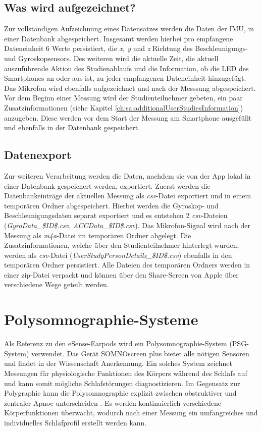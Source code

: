 \subsection{Was wird aufgezeichnet?}
\label{ch:sa:ep:what_to_record}
Zur vollständigen Aufzeichnung eines Datensatzes werden die Daten der IMU, in einer Datenbank abgespeichert.
Insgesamt werden hierbei pro empfangene Dateneinheit 6 Werte persistiert, die \textit{x, y} und \textit{z} Richtung des Beschleunigungs- und Gyroskopsensors. 
Des weiteren wird die aktuelle Zeit, die aktuell auszuführende Aktion des Studienablaufs und die Information, ob die LED des Smartphones an oder aus ist, zu jeder empfangenen Dateneinheit hinzugefügt.
Das Mikrofon wird ebenfalls aufgezeichnet und nach der Messsung abgespeichert.
Vor dem Beginn einer Messung wird der Studienteilnehmer gebeten, ein paar Zusatzinformationen (siehe Kapitel \ref{ch:sa:additionalUserStudiesInformation}) anzugeben.
Diese werden vor dem Start der Messung am Smartphone ausgefüllt und ebenfalls in der Datenbank gespeichert.

\subsection{Datenexport}
\label{ch:sa:ep:export}
Zur weiteren Verarbeitung werden die Daten, nachdem sie von der App lokal in einer Datenbank gespeichert werden, exportiert. 
Zuerst werden die Datenbankeinträge der aktuellen Messung als \textit{csv}-Datei exportiert und in einem temporären Ordner abgespeichert.
Hierbei werden die Gyroskop- und Beschleunigungsdaten separat exportiert und es entstehen 2 \textit{csv}-Dateien (\glqq \textit{GyroData\_\$ID\$.csv}\grqq, \glqq \textit{ACCData\_\$ID\$.csv}\grqq).
Das Mikrofon-Signal wird nach der Messung als \textit{m4a}-Datei im temporären Ordner abgelegt.
Die Zusatzinformationen, welche über den Studienteilnehmer hinterlegt wurden, werden als \textit{csv}-Datei (\glqq \textit{UserStudyPersonDetails\_\$ID\$.csv}\grqq) ebenfalls in den temporären Ordner persistiert.
Alle Dateien des temporären Ordners werden in einer zip-Datei verpackt und können über den Share-Screen von Apple über verschiedene Wege geteilt werden.

\section{Polysomnographie-Systeme}
\label{ch:sa:psg}
Als Referenz zu den eSense-Earpods wird ein Polysomnographie-System (PSG-System) verwendet. 
Das Gerät SOMNOscreen{\texttrademark} plus bietet alle nötigen Sensoren und findet in der Wissenschaft Anerkennung.
Ein solches System zeichnet Messungen für physiologische Funktionen des Körpers während des Schlafs auf und kann somit mögliche Schlafstörungen diagnostizieren.
Im Gegensatz zur Polygraphie kann die Polysomnographie explizit zwischen obstruktiver und zentraler Apnoe unterscheiden \cite{croenleinSchlafmedizin1x1Praxisorientiertes2017}.
Es werden kontinuierlich verschiedene Körperfunktionen überwacht, wodurch nach einer Messung ein umfangreiches und individuelles Schlafprofil erstellt werden kann.

